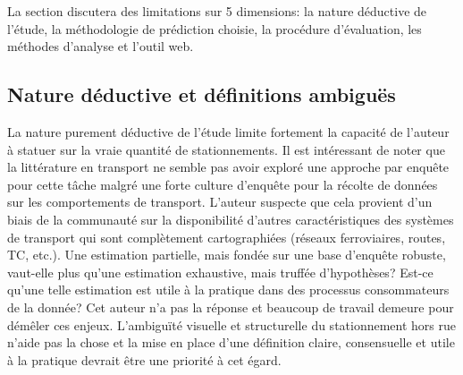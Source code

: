     La section discutera des limitations sur 5 dimensions: la nature déductive de l'étude, la méthodologie de prédiction choisie, la procédure d'évaluation, les méthodes d'analyse et l'outil web. 
    \subsection{Nature déductive et définitions ambiguës}
        La nature purement déductive de l'étude limite fortement la capacité de l'auteur à statuer sur la vraie quantité de stationnements. Il est intéressant de noter que la littérature en transport ne semble pas avoir exploré une approche par enquête pour cette tâche malgré une forte culture d'enquête pour la récolte de données sur les comportements de transport. L'auteur suspecte que cela provient d'un biais de la communauté sur la disponibilité d'autres caractéristiques des systèmes de transport qui sont complètement cartographiées (réseaux ferroviaires, routes, TC, etc.). Une estimation partielle, mais fondée sur une base d'enquête robuste, vaut-elle plus qu'une estimation exhaustive, mais truffée d'hypothèses? Est-ce qu'une telle estimation est utile à la pratique dans des processus consommateurs de la donnée? Cet auteur n'a pas la réponse et beaucoup de travail demeure pour démêler ces enjeux. L'ambiguïté visuelle et structurelle du stationnement hors rue n'aide pas la chose et la mise en place d'une définition claire, consensuelle et utile à la pratique devrait être une priorité à cet égard. 
